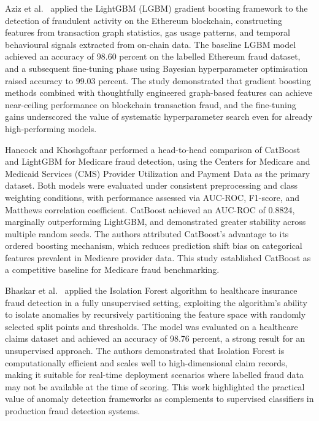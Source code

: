 Aziz et al.\ \cite{aziz2022} applied the LightGBM (LGBM) gradient boosting framework to the detection of fraudulent activity on the Ethereum blockchain, constructing features from transaction graph statistics, gas usage patterns, and temporal behavioural signals extracted from on-chain data. The baseline LGBM model achieved an accuracy of 98.60 percent on the labelled Ethereum fraud dataset, and a subsequent fine-tuning phase using Bayesian hyperparameter optimisation raised accuracy to 99.03 percent. The study demonstrated that gradient boosting methods combined with thoughtfully engineered graph-based features can achieve near-ceiling performance on blockchain transaction fraud, and the fine-tuning gains underscored the value of systematic hyperparameter search even for already high-performing models.

Hancock and Khoshgoftaar \cite{hancock2021} performed a head-to-head comparison of CatBoost and LightGBM for Medicare fraud detection, using the Centers for Medicare and Medicaid Services (CMS) Provider Utilization and Payment Data as the primary dataset. Both models were evaluated under consistent preprocessing and class weighting conditions, with performance assessed via AUC-ROC, F1-score, and Matthews correlation coefficient. CatBoost achieved an AUC-ROC of 0.8824, marginally outperforming LightGBM, and demonstrated greater stability across multiple random seeds. The authors attributed CatBoost's advantage to its ordered boosting mechanism, which reduces prediction shift bias on categorical features prevalent in Medicare provider data. This study established CatBoost as a competitive baseline for Medicare fraud benchmarking.

Bhaskar et al.\ \cite{bhaskar2021} applied the Isolation Forest algorithm to healthcare insurance fraud detection in a fully unsupervised setting, exploiting the algorithm's ability to isolate anomalies by recursively partitioning the feature space with randomly selected split points and thresholds. The model was evaluated on a healthcare claims dataset and achieved an accuracy of 98.76 percent, a strong result for an unsupervised approach. The authors demonstrated that Isolation Forest is computationally efficient and scales well to high-dimensional claim records, making it suitable for real-time deployment scenarios where labelled fraud data may not be available at the time of scoring. This work highlighted the practical value of anomaly detection frameworks as complements to supervised classifiers in production fraud detection systems.

